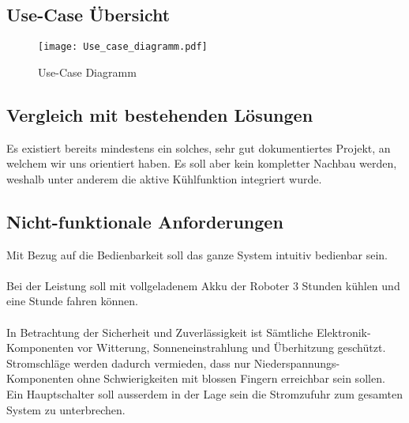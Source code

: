 \subsection{Use-Case Übersicht}
\begin{figure}[H]
    \begin{center}
    \texttt{[image: Use\_case\_diagramm.pdf]}
    \end{center}
    \caption{Use-Case Diagramm}
\end{figure}

\begin{table}[H]
    \centering
    \caption{Use-Case Übersicht}
    \label{tab:my-table}
    \end{table}


\subsection{Vergleich mit bestehenden Lösungen}
Es existiert bereits mindestens ein solches, sehr gut dokumentiertes Projekt, an welchem wir uns orientiert haben. Es soll aber kein kompletter Nachbau werden, weshalb unter anderem die aktive Kühlfunktion integriert wurde.

\pagebreak

\subsection{Nicht-funktionale Anforderungen}
Mit Bezug auf die Bedienbarkeit soll das ganze System intuitiv bedienbar sein.\\
\\
Bei der Leistung soll mit vollgeladenem Akku der Roboter 3 Stunden kühlen und eine Stunde fahren können.\\
\\
In Betrachtung der Sicherheit und Zuverlässigkeit ist Sämtliche Elektronik-Komponenten vor Witterung, Sonneneinstrahlung und Überhitzung geschützt. Stromschläge werden dadurch vermieden, dass nur Niederspannungs-Komponenten ohne Schwierigkeiten mit blossen Fingern erreichbar sein sollen. Ein Hauptschalter soll ausserdem in der Lage sein die Stromzufuhr zum gesamten System zu unterbrechen.
